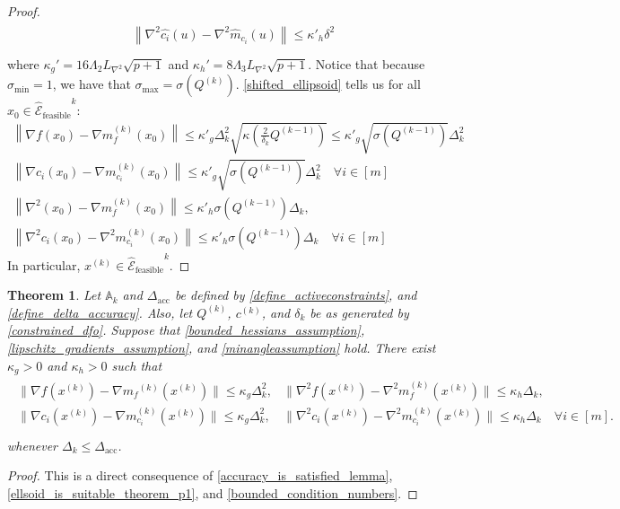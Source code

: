 \documentclass{article}
\newtheorem{theorem}{Theorem}[section]
\theoremstyle{case}
\numberwithin{theorem}{subsection}
\newcommand{\activeconstraintsk}{{\mathbb A_{k}}}
\newcommand{\ck}{{c^{(k)}}}
\newcommand{\dacc}{{\Delta_{\textrm{acc}}}}
\newcommand{\dk}{\Delta_k}
\newcommand{\gmcik}{{\nabla m_{c_i}^{(k)}\left(\xk\right)}}
\newcommand{\gradf}{\nabla f}
\newcommand{\hk}{{\nabla^2m_f^{(k)}\left(\xk\right)}}
\newcommand{\liphess}{{L_{\nabla^2}}}
\newcommand{\mfk}{{{m}_f}^{(k)}}
\newcommand{\qk}{{Q^{(k)}}}
\newcommand{\scaledunshiftedellipsoid}{{{\mathcal {\hat E}_{\text{feasible}}}^k}}
\newcommand{\sdk}{{\delta_k}}
\newcommand{\sigmamax}{{\sigma_{\textrm{max}}}}
\newcommand{\xk}{x^{(k)}}
\newcommand{\qkmo}{{Q^{(k-1)}}}
\begin{document}
\begin{proof}
\begin{align*}
\begin{array}{cc}
\left\|\nabla^2 \hat {c_i}\left(u\right) - \nabla^2 \hat{m}_{c_i}\left(u\right) \right\|\le {\kappa'}_h\delta^2 \\
\end{array}
\end{align*}
where $\kappa_{g}' = 16 \Lambda_2 \liphess \sqrt{p+1}$ and $\kappa_{h}' = 8 \Lambda_3 \liphess \sqrt{p+1}$.
Notice that because $\sigma_{\textrm{min}} = 1$, we have that $\sigmamax = \sigma \left(\qk\right)$.
\cref{shifted_ellipsoid} tells us for all $x_0 \in \scaledunshiftedellipsoid$:
\begin{align*}
\left\|\gradf\left(x_0 \right) - \nabla m^{(k)}_f\left(x_0\right)\right\| \le 
\kappa'_g  \dk^2 \sqrt{\kappa\left(\frac 2 {\sdk} \qkmo\right)} \le \kappa'_g \sqrt{\sigma\left(\qkmo\right)}\dk^2 \\
\left\|\nabla {c_i}\left(x_0 \right) - \nabla m^{(k)}_{c_i}\left(x_0\right)\right\| \le \kappa'_g\sqrt{\sigma\left(\qkmo\right)} \dk^2 \quad \forall i \in [m] \\
\left\|\nabla^2\left(x_0 \right) - \nabla m^{(k)}_f\left(x_0\right)\right\| \le \kappa'_h\sigma\left(\qkmo\right)\dk, \\
\left\|\nabla^2 {c_i}\left(x_0 \right) - \nabla^2 m^{(k)}_{c_i}\left(x_0\right)\right\| \le \kappa'_h\sigma\left(\qkmo\right)\dk \quad \forall i \in [m]
\end{align*}
In particular, $\xk \in \scaledunshiftedellipsoid$.
\end{proof}


\begin{theorem}
\label{accuracy_is_satisfied}
Let $\activeconstraintsk$ and $\dacc$ be defined by \cref{define_activeconstraints}, and \cref{define_delta_accuracy}.
Also, let $\qk$, $\ck$, and $\sdk$ 
be as generated by \cref{constrained_dfo}.
Suppose that 
\cref{bounded_hessians_assumption}, \cref{lipschitz_gradients_assumption}, and \cref{minangleassumption} hold.
There exist $\kappa_g>0$ and $\kappa_h>0$ such that
\begin{align*}
\begin{array}{ccc}
\|\gradf(\xk) - \nabla \mfk(\xk) \| \le \kappa_g \dk^2, & \|\nabla^2 f(\xk) - \hk \| \le \kappa_h \dk, & \\
\|\nabla c_i(\xk) - \gmcik \| \le \kappa_g \dk^2, & \|\nabla^2 c_i(\xk) - \nabla^2 m_{c_i}^{(k)}(\xk) \| \le \kappa_h \dk & \forall i \in [m]. \\
\end{array}
\end{align*}
whenever $\dk \le \dacc$.
\end{theorem}
\begin{proof}
This is a direct consequence of \cref{accuracy_is_satisfied_lemma}, \cref{ellsoid_is_suitable_theorem_p1}, and \cref{bounded_condition_numbers}.
\end{proof}
\end{document}
